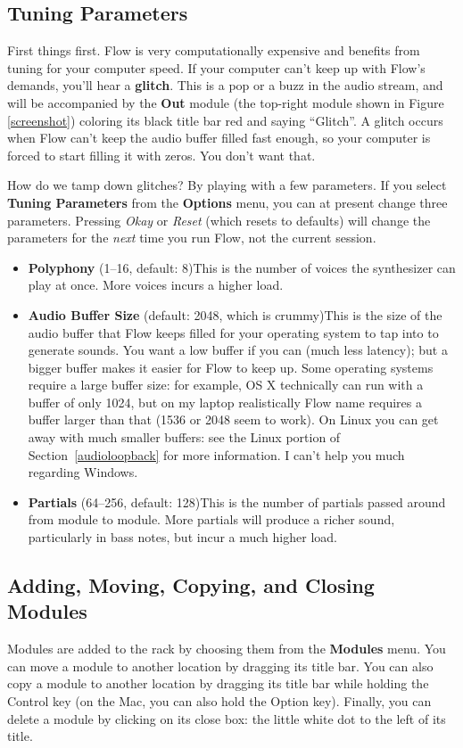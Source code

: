 \documentclass{article}
\newcommand\name{Flow}
\begin{document}
\subsection{Tuning Parameters}
First things first.  {\name} is very computationally expensive and benefits from tuning for your computer speed.  If your computer can't keep up with Flow's demands, you'll hear a {\bf glitch}.  This is a pop or a buzz in the audio stream, and will be accompanied by the {\bf Out} module (the top-right module shown in Figure \ref{screenshot}) coloring its black title bar red and saying ``Glitch''.  A glitch occurs when Flow can't keep the audio buffer filled fast enough, so your computer is forced to start filling it with zeros.  You don't want that.

How do we tamp down glitches?  By playing with a few parameters. If you select {\bf Tuning Parameters} from the {\bf Options} menu, you can at present change three parameters.  Pressing {\it Okay} or {\it Reset} (which resets to defaults) will change the parameters for the {\it next} time you run {\name}, not the current session. 

\begin{itemize}
\item {\bf Polyphony} (1--16, default: 8)\qquad This is the number of voices the synthesizer can play at once.  More voices incurs a higher load.
\item {\bf Audio Buffer Size} (default: 2048, which is crummy)\qquad This is the size of the audio buffer that {\name} keeps filled for your operating system to tap into to generate sounds.  You want a low buffer if you can (much less latency); but a bigger buffer makes it easier for Flow to keep up.  Some operating systems require a large buffer size: for example, OS X technically can run with a buffer of only 1024, but on my laptop realistically {\name} name requires a buffer larger than that (1536 or 2048 seem to work). On Linux you can get away with much smaller buffers: see the Linux portion of Section~\ref{audioloopback} for more information.  I can't help you much regarding Windows.
\item {\bf Partials} (64--256, default: 128)\qquad This is the number of partials passed around from module to module.  More partials will produce a richer sound, particularly in bass notes, but incur a much higher load.
\end{itemize}


\subsection{Adding, Moving, Copying, and Closing Modules}  Modules are added to the rack by choosing them from the {\bf Modules} menu.  You can move a module to another location by dragging its title bar.  You can also copy a module to another location by dragging its title bar while holding the Control key (on the Mac, you can also hold the Option key).  Finally, you can delete a module by clicking on its close box: the little white dot to the left of its title.
\end{document}
